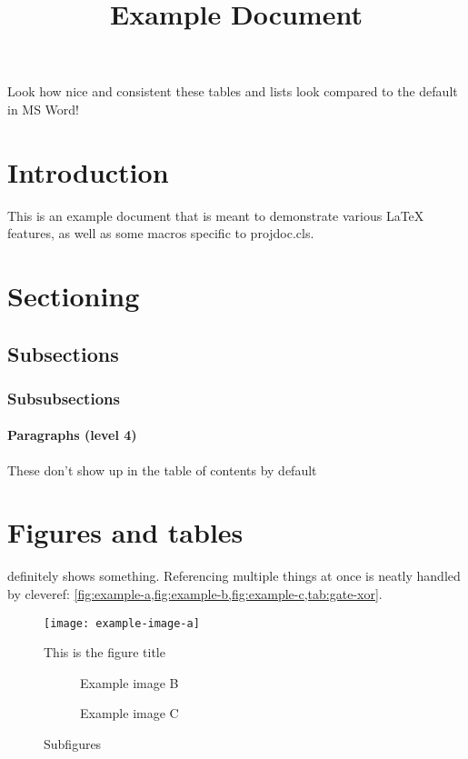 \documentclass{projdoc}
\title{Example Document}
\begin{document}
\tablestables

\bigskip
Look how nice and consistent these tables and lists look compared to the default in
MS Word!

\newpage

\section{Introduction}

This is an example document that is meant to demonstrate various \LaTeX{} features,
as well as some macros specific to \hbox{projdoc.cls}.

\section{Sectioning}
\subsection{Subsections}
\subsubsection{Subsubsections}
\paragraph{Paragraphs (level 4)}

These don't show up in the table of contents by default

\section{Figures and tables}

 definitely shows something. Referencing multiple things at once
is neatly handled by cleveref:
\cref{fig:example-a,fig:example-b,fig:example-c,tab:gate-xor}.

\begin{figure}
	\centering
	\texttt{[image: example-image-a]}
	\caption{This is the figure title}
	\label{fig:example-a} %
\end{figure}

\begin{figure}
	\begin{subfigure}{0.45\textwidth}%
		\caption{Example image B}
		\label{fig:example-b}
	\end{subfigure}%
	\hfill
	\begin{subfigure}{0.45\textwidth}%
		\caption{Example image C}
		\label{fig:example-c}
	\end{subfigure}%
	\caption{Subfigures}
\end{figure}
\end{document}
